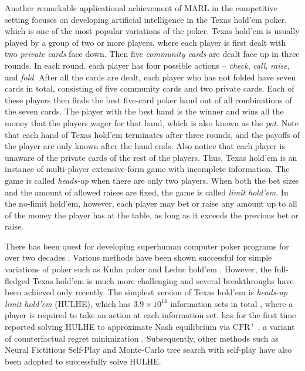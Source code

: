 \vspace{6pt}
\vspace{3pt} 


Another remarkable applicational achievement of MARL in the competitive setting focuses on developing artificial intelligence in the Texas hold'em poker, which is one of the most popular variations of the poker. Texas hold'em is usually played by a group of two or more players,
where each player is first dealt with two  \emph{private cards} face down. Then five \emph{community cards} are dealt face up in three  rounds. 
In each round. each player has four possible actions -- \emph{check}, \emph{call}, \emph{raise}, and \emph{fold}. 
After all the cards are dealt, each player who has not folded have seven cards in total, consisting of five community cards and two private cards. Each of these players  then  finds the best five-card poker hand out of all combinations of the seven cards. The player with the best hand is the winner and wins all the money that the players wager for that hand, which is also known as the \emph{pot}. Note that  each hand of Texas hold'em  terminates after three rounds, and the payoffs of the  player are only known after the hand ends. Also notice that each player is unaware of the private cards of the rest of the players. Thus, Texas hold'em is an instance of  multi-player extensive-form game  with incomplete information. 
The game is called \emph{heads-up} when there are only   two
players. When both the bet sizes and the amount of allowed raises are fixed, the game is called \emph{limit hold'em}. In the no-limit hold'em, however, each player may bet or raise any amount  up to all of the money the player has at the table, as long as  it exceeds the previous bet or raise. 

There has been quest for developing superhuman computer poker programs for over two decades \cite{billings2002challenge, rubin2011computer}. Various methods have been shown successful for simple variations of poker such as Kuhn  poker   \cite{kuhn1950simplified} and Leduc hold'em \cite{southey2005bayes}. However, the full-fledged Texas hold'em  is much more challenging and several breakthroughs have been achieved only recently.  The simplest version of Texas hold'em  is \emph{heads-up limit hold'em} (HULHE), which  has $3.9 \times 10^{14}$ information sets in total \cite{bowling2015heads}, where a player is required to take an action at each information set. \cite{bowling2015heads} has for the first time reported  solving HULHE to approximate Nash equilibrium  via  $\text{CFR}^{+}$ \cite{tammelin2014solving,tammelin2015solving}, a variant of counterfactual regret minimization \cite{zinkevich2008regret}. Subsequently, other methods such as Neural Fictitious Self-Play  \cite{heinrich2016deep}  and Monte-Carlo tree search with self-play \cite{heinrich2015smooth} have also been adopted to successfully solve HULHE. 

